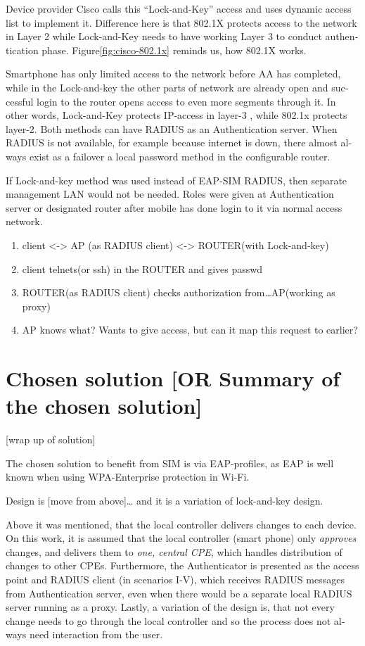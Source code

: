 \documentclass[12pt,a4paper,english]{tutthesis}
\begin{document}
\begin{otherlanguage}{english}
Device provider Cisco calls this ``Lock-and-Key'' access
and uses dynamic access list to implement it.\cite[p.117]{lockandkeybook}
Difference here is that 802.1X protects access to the network in Layer
2 while Lock-and-Key needs to have working Layer 3 to conduct
authentication phase.
Figure\ref{fig:cisco-802.1x} reminds us, how 802.1X works.

 Smartphone has only limited access to the network before AA
has completed, while in the Lock-and-key
the other parts of network are already open and successful login to the router opens
access to even more segments through it. In other words, Lock-and-Key
protects IP-access in layer-3 , while 802.1x protects layer-2.
Both methods can have RADIUS as an Authentication server. 
When RADIUS is not available, for example because internet is down,
there almost always exist as a failover a local password method in the configurable 
router.



If Lock-and-key method was used instead of EAP-SIM RADIUS, then
separate management LAN would not be needed. Roles were given at
Authentication server or designated router after mobile has done login to it
via normal access network.


\begin{enumerate}
\item client <-> AP (as RADIUS client) <-> ROUTER(with Lock-and-key)
\item client telnets(or ssh)  in the ROUTER and gives passwd
\item ROUTER(as RADIUS client) checks authorization from\ldots{}AP(working as
proxy)
\item AP knows what? Wants to give access, but can it map this request to
earlier?
\end{enumerate}
\section{Chosen solution [OR Summary of the chosen solution]}
\label{sec-4-9}

[wrap up of solution]

The chosen solution to benefit from SIM is via EAP-profiles, as EAP
is well known when using WPA-Enterprise protection in Wi-Fi.

Design is [move from above]\ldots{}
and it is a variation of lock-and-key design.

Above it was mentioned, that the local controller delivers changes to each
device. On this work, it is assumed that the local controller (smart
phone) only \emph{approves} changes,
and delivers them to \emph{one, central CPE}, 
which handles distribution of changes to other CPEs.
Furthermore, the Authenticator is presented as the access point and
RADIUS client (in scenarios I-V), which receives RADIUS messages from
Authentication server, even when there would be a separate local RADIUS server
running as a proxy.
Lastly, a variation of the design is, that not every change needs to go
 through  the local controller and so the process does not always need
interaction from the user.




\end{otherlanguage}
\end{document}
